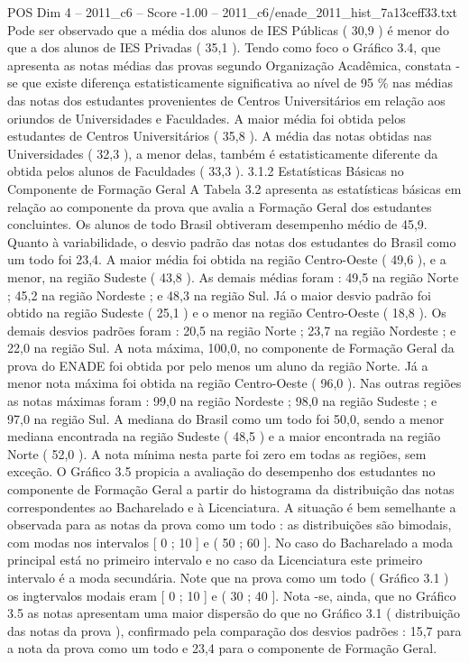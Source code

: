\begin{textsample}{POS Dim 4 – 2011\_c6 – Score -1.00 – 2011\_c6/enade\_2011\_hist\_7a13ceff33.txt}
Pode ser observado que a média dos alunos de IES Públicas ( 30,9 ) é menor do que a dos alunos de IES Privadas ( 35,1 ).
Tendo como foco o Gráfico 3.4, que apresenta as notas médias das provas segundo Organização Acadêmica, constata -se que existe diferença estatisticamente significativa ao nível de 95 \% nas médias das notas dos estudantes provenientes de Centros Universitários em relação aos oriundos de Universidades e Faculdades.
A maior média foi obtida pelos estudantes de Centros Universitários ( 35,8 ).
A média das notas obtidas nas Universidades ( 32,3 ), a menor delas, também é estatisticamente diferente da obtida pelos alunos de Faculdades ( 33,3 ). 3.1.2 Estatísticas Básicas no Componente de Formação Geral A Tabela 3.2 apresenta as estatísticas básicas em relação ao componente da prova que avalia a Formação Geral dos estudantes concluintes.
Os alunos de todo Brasil obtiveram desempenho médio de 45,9.
Quanto à variabilidade, o desvio padrão das notas dos estudantes do Brasil como um todo foi 23,4.
A maior média foi obtida na região Centro-Oeste ( 49,6 ), e a menor, na região Sudeste ( 43,8 ).
As demais médias foram : 49,5 na região Norte ; 45,2 na região Nordeste ; e 48,3 na região Sul.
Já o maior desvio padrão foi obtido na região Sudeste ( 25,1 ) e o menor na região Centro-Oeste ( 18,8 ).
Os demais desvios padrões foram : 20,5 na região Norte ; 23,7 na região Nordeste ; e 22,0 na região Sul.
A nota máxima, 100,0, no componente de Formação Geral da prova do ENADE foi obtida por pelo menos um aluno da região Norte.
Já a menor nota máxima foi obtida na região Centro-Oeste ( 96,0 ).
Nas outras regiões as notas máximas foram : 99,0 na região Nordeste ; 98,0 na região Sudeste ; e 97,0 na região Sul.
A mediana do Brasil como um todo foi 50,0, sendo a menor mediana encontrada na região Sudeste ( 48,5 ) e a maior encontrada na região Norte ( 52,0 ).
A nota mínima nesta parte foi zero em todas as regiões, sem exceção.
O Gráfico 3.5 propicia a avaliação do desempenho dos estudantes no componente de Formação Geral a partir do histograma da distribuição das notas correspondentes ao Bacharelado e à Licenciatura.
A situação é bem semelhante a observada para as notas da prova como um todo : as distribuições são bimodais, com modas nos intervalos [ 0 ; 10 ] e ( 50 ; 60 ].
No caso do Bacharelado a moda principal está no primeiro intervalo e no caso da Licenciatura este primeiro intervalo é a moda secundária.
Note que na prova como um todo ( Gráfico 3.1 ) os ingtervalos modais eram [ 0 ; 10 ] e ( 30 ; 40 ].
Nota -se, ainda, que no Gráfico 3.5 as notas apresentam uma maior dispersão do que no Gráfico 3.1 ( distribuição das notas da prova ), confirmado pela comparação dos desvios padrões : 15,7 para a nota da prova como um todo e 23,4 para o componente de Formação Geral.

\end{textsample}
